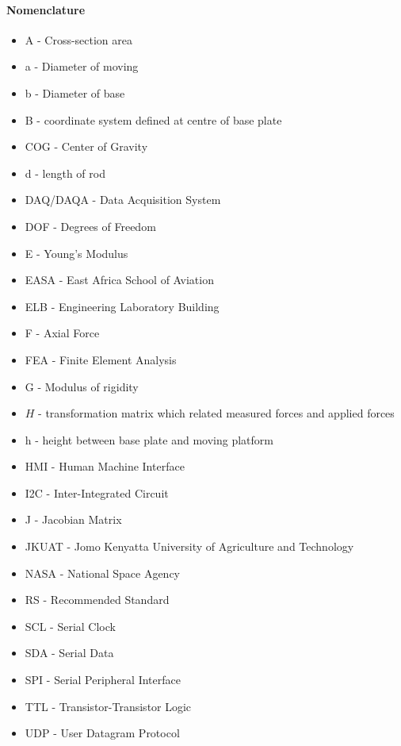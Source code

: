 \paragraph{Nomenclature}
\begin{itemize}
    \item A - Cross-section area
    \item a - Diameter of moving
    \item b - Diameter of base
    \item B - coordinate system defined at centre of base plate
    \item COG - Center of Gravity
    \item d - length of rod
    \item DAQ/DAQA - Data Acquisition System
    \item DOF - Degrees of Freedom
    \item E - Young's Modulus
    \item EASA - East Africa School of Aviation
    \item ELB - Engineering Laboratory Building
    \item F - Axial Force
    \item FEA - Finite Element Analysis
    \item G - Modulus of rigidity
    \item $H$ - transformation matrix which related measured forces and applied forces
    \item h - height between base plate and moving platform
    \item HMI - Human Machine Interface
    \item I2C - Inter-Integrated Circuit
    \item J - Jacobian Matrix
    \item JKUAT - Jomo Kenyatta University of Agriculture and Technology
    \item NASA - National Space Agency
    \item RS - Recommended Standard
    \item SCL - Serial Clock
    \item SDA - Serial Data
    \item SPI - Serial Peripheral Interface
    \item TTL - Transistor-Transistor Logic
    \item UDP - User Datagram Protocol
\end{itemize}
\pagebreak
